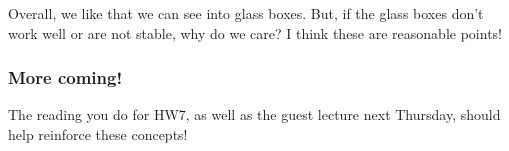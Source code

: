 Overall, we like that we can see into glass boxes. But, if the glass boxes don't work well or are not stable, why do we care? I think these are reasonable points!

\subsubsection{More coming!}

The reading you do for HW7, as well as the guest lecture next Thursday, should help reinforce these concepts!



